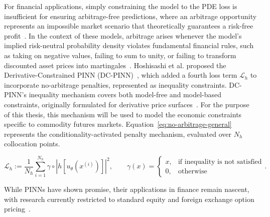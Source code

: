 \documentclass[11pt, a4paper]{article}
\begin{document}
For financial applications, simply constraining the model to the PDE loss is insufficient for ensuring arbitrage-free predictions, where an arbitrage opportunity represents an impossible market scenario that theoretically guarantees a risk-free profit~\cite{Hoshisashi2024Whack-a-moleSurface}. In the context of these models, arbitrage arises whenever the model's implied risk-neutral probability density violates fundamental financial rules, such as taking on negative values, failing to sum to unity, or failing to transform discounted asset prices into martingales~\cite{Hoshisashi2025ProbabilitCalibration}. Hoshisashi et al. proposed the Derivative-Constrained PINN (DC-PINN)~\cite{Hoshisashi2024Physics-InformedPDEs}, which added a fourth loss term $\mathcal{L}_h$ to incorporate no-arbitrage penalties, represented as inequality constraints. DC-PINN's inequality mechanism covers both model-free and model-based constraints, originally formulated for derivative price surfaces~\cite{Hoshisashi2024Physics-InformedPDEs}. For the purpose of this thesis, this mechanism will be used to model the economic constraints specific to commodity futures markets. Equation~\ref{eq:no-arbitrage-general} represents the conditionality-activated penalty mechanism, evaluated over $N_h$ collocation points.

\begin{equation} \label{eq:no-arbitrage-general}
    \mathcal{L}_h := \frac{1}{N_h}\sum_{i=1}^{N_h} \gamma \circ \left|h\left[u_\theta(x^{(i)})\right]\right|^2, \qquad
\gamma(x) = \begin{cases} x, & \text{if inequality is not satisfied} \\ 0, & \text{otherwise} \end{cases}.
\end{equation}

While PINNs have shown promise, their applications in finance remain nascent, with research currently restricted to standard equity and foreign exchange option pricing~\cite{Dhiman2023PhysicsPricing}. 
\end{document}
